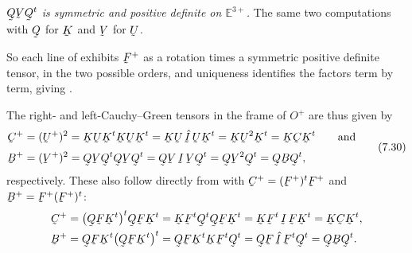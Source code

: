 \emph{$\bQ\bV\bQ^{t}$ is symmetric and positive definite on
$\mathbb{E}^{3+}$.} The same two computations with $\bQ$ for $\bK$ and
$\bV$ for $\bU$.

So each line of  exhibits $\bF^{+}$ as a rotation times a
symmetric positive definite tensor, in the two possible orders, and
uniqueness identifies the factors term by term, giving .

The right- and left-Cauchy--Green tensors in the frame of $O^{+}$ are
thus given by
\begin{equation}
\begin{aligned}
   \bC^{+}&=(\bU^{+})^{2}=\bK\bU\bK^{t}\bK\bU\bK^{t}
    =\bK\bU\,\hI\,\bU\bK^{t}=\bK\bU^{2}\bK^{t}=\bK\bC\bK^{t}
   \qquad\text{and}\\[1mm]
   \bB^{+}&=(\bV^{+})^{2}=\bQ\bV\bQ^{t}\bQ\bV\bQ^{t}
    =\bQ\bV\,\I\,\bV\bQ^{t}=\bQ\bV^{2}\bQ^{t}=\bQ\bB\bQ^{t},
\end{aligned}
   \tag{7.30}\label{eq:7.30}
\end{equation}
respectively. These also follow directly from  with
$\bC^{+}=(\bF^{+})^{t}\bF^{+}$ and $\bB^{+}=\bF^{+}(\bF^{+})^{t}$:
\[
\begin{aligned}
   \bC^{+}&=\big(\bQ\bF\bK^{t}\big)^{t}\bQ\bF\bK^{t}
    =\bK\bF^{t}\bQ^{t}\bQ\bF\bK^{t}=\bK\bF^{t}\,\I\,\bF\bK^{t}
    =\bK\bC\bK^{t},\\
   \bB^{+}&=\bQ\bF\bK^{t}\big(\bQ\bF\bK^{t}\big)^{t}
    =\bQ\bF\bK^{t}\bK\bF^{t}\bQ^{t}=\bQ\bF\,\hI\,\bF^{t}\bQ^{t}
    =\bQ\bB\bQ^{t}.
\end{aligned}
\]

